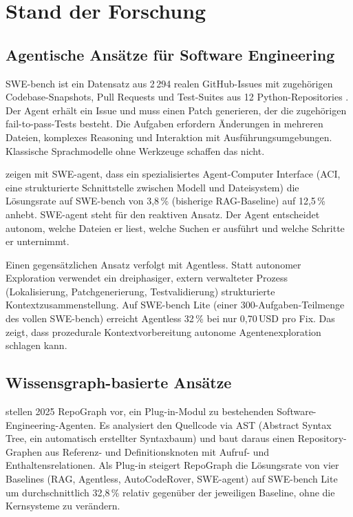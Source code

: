 \section{Stand der Forschung}

\subsection*{Agentische Ansätze für Software Engineering}

SWE-bench ist ein Datensatz aus 2\,294 realen GitHub-Issues mit zugehörigen
Codebase-Snapshots, Pull Requests und Test-Suites aus 12 Python-Repositories
\parencite{jimenez2024swebench}.
Der Agent erhält ein Issue und muss einen Patch generieren,
der die zugehörigen fail-to-pass-Tests besteht.
Die Aufgaben erfordern Änderungen in mehreren Dateien, komplexes Reasoning
und Interaktion mit Ausführungsumgebungen.
Klassische Sprachmodelle ohne Werkzeuge schaffen das nicht.

\textcite{yang2024sweagent} zeigen mit SWE-agent, dass ein spezialisiertes
Agent-Computer Interface (ACI, eine strukturierte Schnittstelle zwischen
Modell und Dateisystem) die Lösungsrate auf SWE-bench
von 3,8\,\% (bisherige RAG-Baseline) auf 12,5\,\% anhebt.
SWE-agent steht für den reaktiven Ansatz.
Der Agent entscheidet autonom, welche Dateien er liest,
welche Suchen er ausführt und welche Schritte er unternimmt.

Einen gegensätzlichen Ansatz verfolgt \textcite{xia2024agentless} mit Agentless.
Statt autonomer Exploration verwendet ein dreiphasiger, extern verwalteter Prozess
(Lokalisierung, Patchgenerierung, Testvalidierung) strukturierte Kontextzusammenstellung.
Auf SWE-bench Lite (einer 300-Aufgaben-Teilmenge des vollen SWE-bench)
erreicht Agentless 32\,\% bei nur 0,70\,USD pro Fix.
Das zeigt, dass prozedurale Kontextvorbereitung autonome Agentenexploration schlagen kann.


\subsection*{Wissensgraph-basierte Ansätze}

\textcite{ouyang2024repograph} stellen 2025 RepoGraph vor,
ein Plug-in-Modul zu bestehenden Software-Engineering-Agenten.
Es analysiert den Quellcode via AST (Abstract Syntax Tree,
ein automatisch erstellter Syntaxbaum)
und baut daraus einen Repository-Graphen aus Referenz- und Definitionsknoten
mit Aufruf- und Enthaltensrelationen.
Als Plug-in steigert RepoGraph die Lösungsrate von vier Baselines
(RAG, Agentless, AutoCodeRover, SWE-agent) auf SWE-bench Lite
um durchschnittlich 32,8\,\% relativ gegenüber der jeweiligen Baseline,
ohne die Kernsysteme zu verändern.

